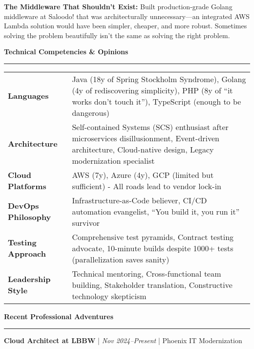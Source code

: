 \documentclass[11pt,a4paper]{article}
\newcommand{\sectionheader}[1]{
    \vspace{0.4em}
    {\Large \textbf{\textsf{\textcolor{primarycolor}{#1}}}}
    \vspace{0.2em}
    \hrule
    \vspace{0.3em}
}
\newcommand{\jobheader}[3]{
    \vspace{0.2em}
    \textbf{#1} | \textit{#2} | #3
    \vspace{0.1em}
}
\begin{document}
\textbf{The Middleware That Shouldn't Exist:} Built production-grade Golang middleware at Saloodo! that was architecturally unnecessary---an integrated AWS Lambda solution would have been simpler, cheaper, and more robust. Sometimes solving the problem beautifully isn't the same as solving the right problem.

\sectionheader{Technical Competencies \& Opinions}

\begin{tabularx}{\textwidth}{@{}p{3cm}X@{}}
\textbf{Languages} & Java (18y of Spring Stockholm Syndrome), Golang (4y of rediscovering simplicity), PHP (8y of ``it works don't touch it''), TypeScript (enough to be dangerous) \\[0.2em]
\textbf{Architecture} & Self-contained Systems (SCS) enthusiast after microservices disillusionment, Event-driven architecture, Cloud-native design, Legacy modernization specialist \\[0.2em]
\textbf{Cloud Platforms} & AWS (7y), Azure (4y), GCP (limited but sufficient) - All roads lead to vendor lock-in \\[0.2em]
\textbf{DevOps Philosophy} & Infrastructure-as-Code believer, CI/CD automation evangelist, ``You build it, you run it'' survivor \\[0.2em]
\textbf{Testing Approach} & Comprehensive test pyramids, Contract testing advocate, 10-minute builds despite 1000+ tests (parallelization saves sanity) \\[0.2em]
\textbf{Leadership Style} & Technical mentoring, Cross-functional team building, Stakeholder translation, Constructive technology skepticism
\end{tabularx}

\vfill

\newpage

\sectionheader{Recent Professional Adventures}

\jobheader{Cloud Architect at LBBW}{Nov 2024--Present}{Phoenix IT Modernization}
\end{document}
